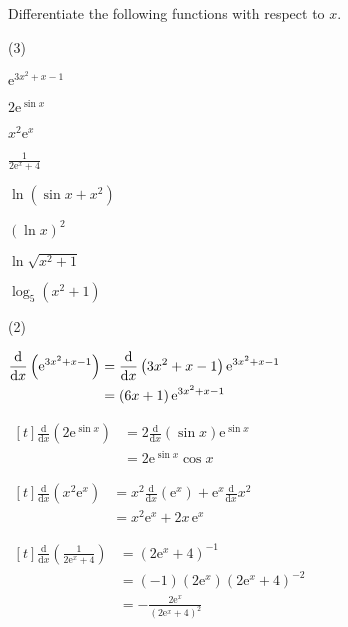 \documentclass[11pt,a4paper]{book}
\begin{document}
\begin{example}

Differentiate the following functions with respect to $x$.

\begin{tasks}[label=(\alph*),label-width=3.5ex](3)

\task $\mathrm{e}^{3x^{2}+x-1}$

\task $2\mathrm{e}^{\sin x}$

\task $x^{2}\mathrm{e}^{x}$

\task ${\displaystyle \frac{1}{2\mathrm{e}^{x}+4}}$

\task $\ln\left(\sin x+x^{2}\right)$

\task $\left(\ln x\right)^{2}$

\task  $\ln\sqrt{x^{2}+1}$

\task  $\log_{5}\left(x^{2}+1\right)$

\end{tasks}

\Solution

\begin{tasks}[label=(\alph*),label-width=3.5ex,after-item-skip = .5cm](2)

\task
$
\begin{aligned}[t]
{\displaystyle \frac{\mathrm{d}}{\mathrm{d}x}\left({\displaystyle \mathrm{e}^{3x^{2}+x-1}}\right)} & =\frac{\mathrm{d}}{\mathrm{d}x}\left(3x^{2}+x-1\right)\mathrm{e}^{3x^{2}+x-1}\hspace{0.5cm}\\
 & =\left(6x+1\right)\mathrm{e}^{3x^{2}+x-1}
\end{aligned}
$


\task
$
\begin{aligned}[t]
{\displaystyle \frac{\mathrm{d}}{\mathrm{d}x}\left({\displaystyle 2\mathrm{e}^{\sin x}}\right)} & =2\frac{\mathrm{d}}{\mathrm{d}x}\left(\sin x\right)\mathrm{e}^{\sin x}\\
 & =2{\displaystyle \mathrm{e}^{\sin x}\cos x}
\end{aligned}
$

\task
$
\begin{aligned}[t]
{\displaystyle \frac{\mathrm{d}}{\mathrm{d}x}\left({\displaystyle x^{2}\mathrm{e}^{x}}\right)} & =x^{2}\frac{\mathrm{d}}{\mathrm{d}x}\left(\mathrm{e}^{x}\right)+\mathrm{e}^{x}\frac{\mathrm{d}}{\mathrm{d}x}x^{2}\\
 & =x^{2}\mathrm{e}^{x}+2x\, \mathrm{e}^{x}
\end{aligned}
$

\task
$
\begin{aligned}[t]
{\displaystyle \frac{\mathrm{d}}{\mathrm{d}x}\left(\frac{1}{2\mathrm{e}^{x}+4}\right)} & =\left(2\mathrm{e}^{x}+4\right)^{-1}\\
 & =\left(-1\right)\left(2\mathrm{e}^{x}\right)\left(2\mathrm{e}^{x}+4\right)^{-2}\\
 & =-\frac{2\mathrm{e}^{x}}{\left(2\mathrm{e}^{x}+4\right)^{2}}
\end{aligned}
$




\end{tasks}
\end{example}
\end{document}
